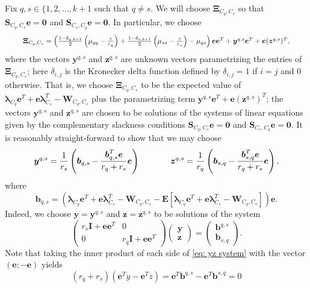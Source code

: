 \documentclass[twoside,11pt]{article}
\renewcommand{\S}{\mathbf{S}}
\newcommand{\E}{\mathbf{E}}
\renewcommand{\b}{{\bs{b}}}
\newcommand{\e}{\bs {e}}
\newcommand{\bs}{\boldsymbol}
\newcommand{\y}{\bs {y}}
\newcommand{\W}{\bs {W}}
\newcommand{\z}{\bs{z}}
\newcommand{\0}{\bs{0}}
\newcommand{\vect}[1] {\ensuremath{\left(\begin{array}{c} #1 \end{array} \right)}} %
\newcommand{\mat}[1] {\ensuremath{ \left(\begin{array} #1 \end{array} \right)}} %
\newcommand{\sbra}[1] {\ensuremath{ \left[ #1\right]}} %
\newcommand{\rbra}[1]{\ensuremath{\left( #1 \right)}} %
\begin{document}
{%
Fix \(q, s \in \{1,2,\dots, k+1\) such that \(q\neq s\).
We will choose \(\bs \Xi_{C_q, C_s} \) so that \(\S_{C_q, C_s}\e = \bs 0\) and \( \S_{C_s, C_q} \e = \bs 0 \).
In particular, we choose
\begin{equation} \label{eq: Xi choice 1}
	\resizebox{0.92\hsize}{!}{$
\bs\Xi_{C_q, C_s} = \rbra{ \frac{1-\delta_{q, k+1}}{2}
\rbra{\mu_{qq} - \frac{\tau}{r_q}} +
\frac{1-\delta_{s, k+1}}{2}
\rbra{\mu_{ss} - \frac{\tau}{r_s}} - \mu_{qs}} \e\e^T
+ \y^{q,s} \e^T + \e (\z^{q,s})^T,
$}
\end{equation}
where the vectors \( \y^{q,s}\) and \(\z^{q,s}\) are unknown vectors parametrizing the entries of \(\bs\Xi_{C_q, C_s}\);
here
\(\delta_{i,j}\) is the Kronecker delta function defined by \( \delta_{i,j} = 1 \) if \(i=j\)
	and \(0\) otherwise.
That is, we choose \(\bs\Xi_{C_q, C_s} \) to be the expected value of
\( \bs \lambda_{C_q} \e^T + \e \bs \lambda_{C_s}^T
- \W_{C_q, C_s} \) plus the parametrizing term \(\y^{q,s} \e^T + \e (\z^{q,s})^T\); the vectors
\( \y^{q,s}\) and \(\z^{q,s}\) are chosen to be solutions of the systems of linear equations given
by the complementary slackness conditions
\(\S_{C_q, C_s}\e = \bs 0\) and \( \S_{C_s, C_q} \e = \bs 0 \).
It is reasonably straight-forward to show that we may choose
\begin{equation} \label{eq: y z}
\y^{q,s} = \frac{1}{r_s} \rbra{ \b_{q,s} - \frac{\b_{q,s}^T \e }{r_q + r_s} \e }
\hspace{0.5in}
\z^{q,s} = \frac{1}{r_q} \rbra{ \b_{s,q} - \frac{\b_{s,q}^T \e}{r_q + r_s} \e },
\end{equation}
where
\begin{equation} \label{eq: b}
\b_{q,s} = \rbra{ \bs \lambda_{C_q} \e^T + \e \bs \lambda_{C_s}^T
- \W_{C_q, C_s} - \E\sbra{\bs \lambda_{C_q} \e^T + \e \bs \lambda_{C_s}^T
- \W_{C_q, C_s}} } \e.
\end{equation}
Indeed, we choose $\y = \y^{q,s}$ and $\z = \z^{q,s}$
to be solutions of the system
\newcommand{\I}{\bs I}
\begin{equation} \label{eq: yz system}
	\mat{{cc} r_s \I + \e\e^T & 0 \\ 0 & r_q \I + \e\e^T }
	\vect{ \y \\ \z } = \vect{\b^{q,s} \\ \b_{s,q} }.
\end{equation}
Note that taking the inner product of each side
of \eqref{eq: yz system} with the vector \( (\e; -\e) \)
yields
\[
	(r_q + r_s)( \e^T y -  \e^T z) = \e^T \b^{q,s} - \e^T \b^{s,q}
	= 0
\]}
\end{document}
